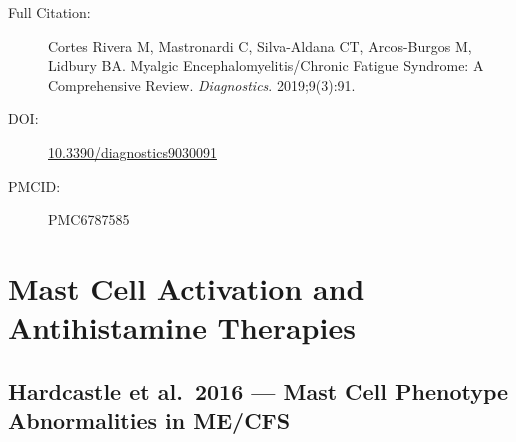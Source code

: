 \begin{description}
    \item[Full Citation:] Cortes Rivera M, Mastronardi C, Silva-Aldana CT, Arcos-Burgos M, Lidbury BA. Myalgic Encephalomyelitis/Chronic Fatigue Syndrome: A Comprehensive Review. \textit{Diagnostics}. 2019;9(3):91.
    \item[DOI:] \href{https://doi.org/10.3390/diagnostics9030091}{10.3390/diagnostics9030091}
    \item[PMCID:] PMC6787585
\end{description}

\section{Mast Cell Activation and Antihistamine Therapies}
\label{sec:bib-mast-cell-antihistamines}

\subsection{Hardcastle et al.\ 2016 --- Mast Cell Phenotype Abnormalities in ME/CFS}

